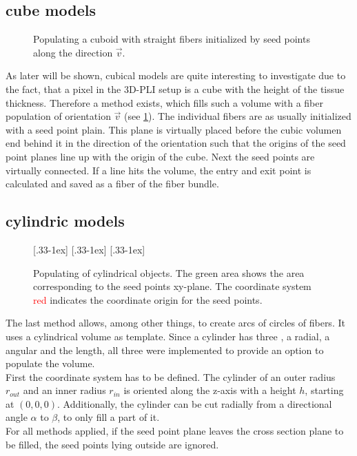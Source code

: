 \subsection{cube models} \label{sec:cubeModelBuilding}
%
\begin{figure}[!t]
    \centering
    \setlength{\tikzwidth}{0.5\textwidth}
	\caption{Populating a cuboid with straight fibers initialized by seed points along the direction $\vec{v}$.}
    \label{fig:cubeBuild}%
\end{figure}
%
As later will be shown, cubical models are quite interesting to investigate due to the fact, that a pixel in the \ac{3D-PLI} setup is a cube with the height of the tissue thickness.
Therefore a method exists, which fills such a volume with a fiber population of orientation $\vec{v}$ (see \cref{fig:cubeBuild}).
The individual fibers are as usually initialized with a seed point plain.
This plane is virtually placed before the cubic volumen end behind it in the direction of the orientation such that the origins of the seed point planes line up with the origin of the cube.
Next the seed points are virtually connected.
If a line hits the volume, the entry and exit point is calculated and saved as a fiber of the fiber bundle.
%
%
%
\subsection{cylindric models}
%
\begin{figure}[!t]
    \centering
    \setlength{\tikzwidth}{0.31\textwidth}
    [.33\textwidth-1ex]{
    }\hfill
    [.33\textwidth-1ex]{
    }\hfill
    [.33\textwidth-1ex]{
    }
	\caption{Populating of cylindrical objects. The green area shows the area corresponding to the seed points xy-plane. The coordinate system \textcolor{RED}{red} indicates the coordinate origin for the seed points.}
\end{figure}
%
The last method allows, among other things, to create arcs of circles of fibers.
It uses a cylindrical volume as template.
%
Since a cylinder has three , a radial, a angular and the length, all three were implemented to provide an option to populate the volume.
\\
%
First the coordinate system has to be defined.
The cylinder of an outer radius $r_{\mathit{out}}$ and an inner radius $r_{\mathit{in}}$ is oriented along the z-axis with a height $h$, starting at $(0,0,0)$.
Additionally, the cylinder can be cut radially from a directional angle $\alpha$ to $\beta$, to only fill a part of it.
\\
%
For all methods applied, if the seed point plane leaves the cross section plane to be filled, the seed points lying outside are ignored.
%
